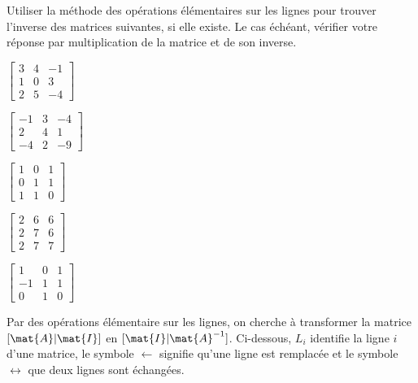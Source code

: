 \begin{exercice}
  \label{ex:revision:inverse_par_op_elementaires}
  Utiliser la méthode des opérations élémentaires sur les lignes pour
  trouver l'inverse des matrices suivantes, si elle existe. Le cas
  échéant, vérifier votre réponse par multiplication de la matrice et
  de son inverse.
  \begin{enumerate}
    \begin{multicols}{3}
    \item $%
      \begin{bmatrix}
        3 & 4 & -1 \\ 1 & 0 & 3 \\ 2 & 5 & -4
      \end{bmatrix}$
    \item $%
      \begin{bmatrix}
        -1 & 3 & -4 \\ 2 & 4 & 1 \\ -4 & 2 & -9
      \end{bmatrix}$
    \item $%
      \begin{bmatrix}
        1 & 0 & 1 \\ 0 & 1 & 1 \\ 1 & 1 & 0
      \end{bmatrix}$
    \end{multicols}
    \begin{multicols}{3}
    \item $%
      \begin{bmatrix}
        2 & 6 & 6 \\ 2 & 7 & 6 \\ 2 & 7 & 7
      \end{bmatrix}$
    \item $%
      \begin{bmatrix}
        1 & 0 & 1 \\ -1 & 1 & 1 \\ 0 & 1 & 0
      \end{bmatrix}$
    \end{multicols}
  \end{enumerate}
  \begin{sol}
    Par des opérations élémentaire sur les lignes, on cherche à
    transformer la matrice $[\mat{A}|\mat{I}]$ en
    $[\mat{I}|\mat{A}^{-1}]$. Ci-dessous, $L_i$ identifie la ligne $i$
    d'une matrice, le symbole $\leftarrow$ signifie qu'une ligne est
    remplacée et le symbole $\leftrightarrow$ que deux lignes sont
    échangées.
    \newpage

\end{sol}
\end{exercice}
